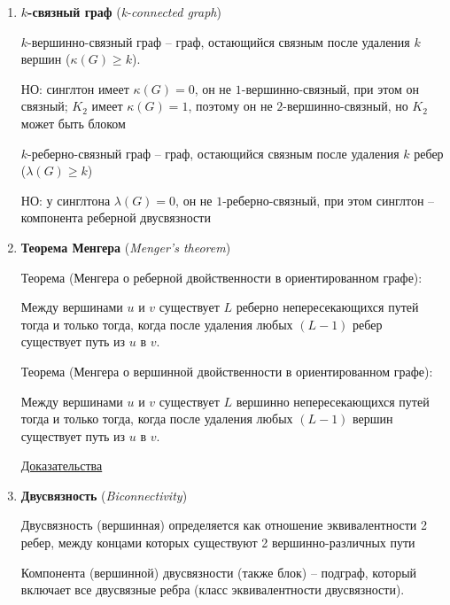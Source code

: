 \documentclass[12pt]{article}
\begin{document}
\begin{enumerate}
        Допустим, что $\lambda(G) > \delta(G)$, тогда мы можем найти в графе вершину с наименьшей степенью $\delta(G)$,
        при удалении $\delta(G)$ ребер граф распадется, значит $\lambda(G) = \delta(G)$ -- противоречие

        $\Box$


        \item \textbf{$k$-связный граф} (\textit{k-connected graph})

        $k$-вершинно-связный граф -- граф, остающийся связным после удаления $k$ вершин ($\kappa(G) \geq k$).

        НО: синглтон имеет $\kappa(G) = 0$, он не $1$-вершинно-связный, при этом он связный; $K_2$ имеет $\kappa(G) = 1$,
        поэтому он не $2$-вершинно-связный, но $K_2$ может быть блоком

        $k$-реберно-связный граф -- граф, остающийся связным после удаления $k$ ребер ($\lambda(G) \geq k$)

        НО: у синглтона $\lambda(G) = 0$, он не $1$-реберно-связный, при этом синглтон -- компонента реберной двусвязности

        \item \textbf{Теорема Менгера} (\textit{Menger's theorem})

        Теорема (Менгера о реберной двойственности в ориентированном графе):

        Между вершинами $u$ и $v$ существует $L$ реберно непересекающихся путей тогда и только тогда,
        когда после удаления любых $(L - 1)$ ребер существует путь из $u$ в $v$.

        Теорема (Менгера о вершинной двойственности в ориентированном графе):

        Между вершинами $u$ и $v$ существует $L$ вершинно непересекающихся путей тогда и только тогда,
        когда после удаления любых $(L - 1)$ вершин существует путь из $u$ в $v$.

        \href{https://neerc.ifmo.ru/wiki/index.php?title=%D0%A2%D0%B5%D0%BE%D1%80%D0%B5%D0%BC%D0%B0_%D0%9C%D0%B5%D0%BD%D0%B3%D0%B5%D1%80%D0%B0#.D0.A2.D0.B5.D0.BE.D1.80.D0.B5.D0.BC.D0.B0}{Доказательства}


        \item \textbf{Двусвязность} (\textit{Biconnectivity})

        Двусвязность (вершинная) определяется как отношение эквивалентности 2 ребер, между концами которых существуют 2 вершинно-различных пути  %

        Компонента (вершинной) двусвязности (также блок) -- подграф, который включает все двусвязные ребра (класс эквивалентности двусвязности).


\end{enumerate}
\end{document}
